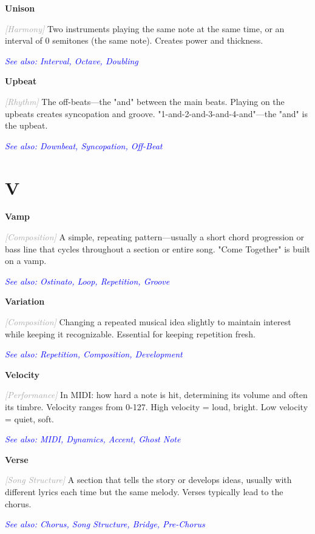 \documentclass[11pt,letterpaper]{article}
\newcommand{\term}[1]{\textbf{\large\color{purple}#1}}
\newcommand{\category}[1]{\textcolor{darkgray}{\textit{\small [#1]}}}
\newcommand{\seealso}[1]{\textcolor{blue}{\textit{See also: #1}}}
\newenvironment{termdef}[1]
  {\noindent\term{#1}\par\nopagebreak}
  {\par\vspace{0.3em}}
\begin{document}
\begin{termdef}{Unison}
\category{Harmony}
Two instruments playing the same note at the same time, or an interval of 0 semitones (the same note). Creates power and thickness.

\seealso{Interval, Octave, Doubling}
\end{termdef}

\begin{termdef}{Upbeat}
\category{Rhythm}
The off-beats—the "and" between the main beats. Playing on the upbeats creates syncopation and groove. "1-and-2-and-3-and-4-and"—the "and" is the upbeat.

\seealso{Downbeat, Syncopation, Off-Beat}
\end{termdef}

\section*{V}

\begin{termdef}{Vamp}
\category{Composition}
A simple, repeating pattern—usually a short chord progression or bass line that cycles throughout a section or entire song. "Come Together" is built on a vamp.

\seealso{Ostinato, Loop, Repetition, Groove}
\end{termdef}

\begin{termdef}{Variation}
\category{Composition}
Changing a repeated musical idea slightly to maintain interest while keeping it recognizable. Essential for keeping repetition fresh.

\seealso{Repetition, Composition, Development}
\end{termdef}

\begin{termdef}{Velocity}
\category{Performance}
In MIDI: how hard a note is hit, determining its volume and often its timbre. Velocity ranges from 0-127. High velocity = loud, bright. Low velocity = quiet, soft.

\seealso{MIDI, Dynamics, Accent, Ghost Note}
\end{termdef}

\begin{termdef}{Verse}
\category{Song Structure}
A section that tells the story or develops ideas, usually with different lyrics each time but the same melody. Verses typically lead to the chorus.

\seealso{Chorus, Song Structure, Bridge, Pre-Chorus}
\end{termdef}
\end{document}
